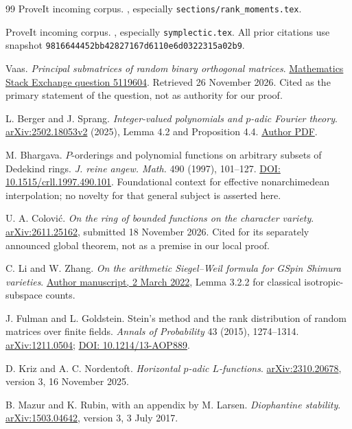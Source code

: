\begin{thebibliography}{99}
 ProveIt incoming corpus.
, especially \texttt{sections/rank\_moments.tex}.

 ProveIt incoming corpus.
, especially \texttt{symplectic.tex}. All prior citations use snapshot \texttt{9816644452bb42827167d6110e6d0322315a02b9}.

 Vaas.
\emph{Principal submatrices of random binary orthogonal matrices}.
\href{https://math.stackexchange.com/questions/5119604/principal-submatrices-of-random-binary-orthogonal-matrices}{Mathematics Stack Exchange question 5119604}. Retrieved 26 November 2026. Cited as the primary statement of the question, not as authority for our proof.

 L. Berger and J. Sprang.
\emph{Integer-valued polynomials and $p$-adic Fourier theory}.
\href{https://arxiv.org/abs/2502.18053v2}{arXiv:2502.18053v2} (2025), Lemma 4.2 and Proposition 4.4.
\href{https://perso.ens-lyon.fr/laurent.berger/articles/POLINT.pdf}{Author PDF}.

 M. Bhargava.
$P$-orderings and polynomial functions on arbitrary subsets of Dedekind rings.
\emph{J. reine angew. Math.} 490 (1997), 101--127.
\href{https://doi.org/10.1515/crll.1997.490.101}{DOI: 10.1515/crll.1997.490.101}. Foundational context for effective nonarchimedean interpolation; no novelty for that general subject is asserted here.

 U. A. Colovi\'c.
\emph{On the ring of bounded functions on the character variety}.
\href{https://arxiv.org/abs/2611.25162}{arXiv:2611.25162}, submitted 18 November 2026. Cited for its separately announced global theorem, not as a premise in our local proof.

 C. Li and W. Zhang.
\emph{On the arithmetic Siegel--Weil formula for GSpin Shimura varieties}.
\href{https://www.math.columbia.edu/~chaoli/KRO.pdf}{Author manuscript, 2 March 2022}, Lemma 3.2.2 for classical isotropic-subspace counts.

 J. Fulman and L. Goldstein.
Stein's method and the rank distribution of random matrices over finite fields.
\emph{Annals of Probability} 43 (2015), 1274--1314.
\href{https://arxiv.org/abs/1211.0504}{arXiv:1211.0504};
\href{https://doi.org/10.1214/13-AOP889}{DOI: 10.1214/13-AOP889}.

 D. Kriz and A. C. Nordentoft.
\emph{Horizontal $p$-adic $L$-functions}.
\href{https://arxiv.org/abs/2310.20678}{arXiv:2310.20678}, version 3, 16 November 2025.

 B. Mazur and K. Rubin, with an appendix by M. Larsen.
\emph{Diophantine stability}.
\href{https://arxiv.org/abs/1503.04642}{arXiv:1503.04642}, version 3, 3 July 2017.
\end{thebibliography}
\endgroup
